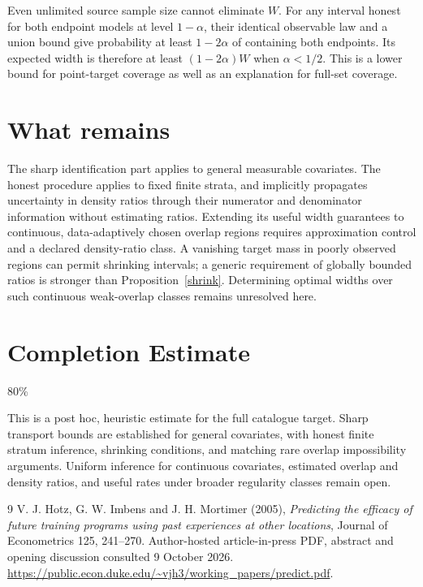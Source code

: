 \documentclass[11pt]{article}
\theoremstyle{remark}\newtheorem{remark}[theorem]{Remark}
\begin{document}
Even unlimited source sample size cannot eliminate $W$. For any interval honest for both endpoint models at level $1-\alpha$, their identical observable law and a union bound give probability at least $1-2\alpha$ of containing both endpoints. Its expected width is therefore at least $(1-2\alpha)W$ when $\alpha<1/2$. This is a lower bound for point-target coverage as well as an explanation for full-set coverage.

\section{What remains}
The sharp identification part applies to general measurable covariates. The honest procedure applies to fixed finite strata, and implicitly propagates uncertainty in density ratios through their numerator and denominator information without estimating ratios. Extending its useful width guarantees to continuous, data-adaptively chosen overlap regions requires approximation control and a declared density-ratio class. A vanishing target mass in poorly observed regions can permit shrinking intervals; a generic requirement of globally bounded ratios is stronger than Proposition~\ref{shrink}. Determining optimal widths over such continuous weak-overlap classes remains unresolved here.

\section{Completion Estimate}
80\%

This is a post hoc, heuristic estimate for the full catalogue target.
Sharp transport bounds are established for general covariates, with honest finite stratum inference, shrinking conditions, and matching rare overlap impossibility arguments. Uniform inference for continuous covariates, estimated overlap and density ratios, and useful rates under broader regularity classes remain open.

\begin{thebibliography}{9}
 V. J. Hotz, G. W. Imbens and J. H. Mortimer (2005), \emph{Predicting the efficacy of future training programs using past experiences at other locations}, Journal of Econometrics 125, 241--270. Author-hosted article-in-press PDF, abstract and opening discussion consulted 9 October 2026. \url{https://public.econ.duke.edu/~vjh3/working_papers/predict.pdf}.
\end{thebibliography}
\end{document}
